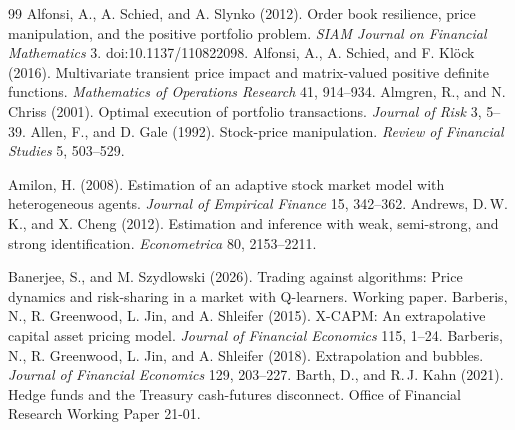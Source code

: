 \begin{thebibliography}{99}\setlength{\itemsep}{2pt}\small
{} Alfonsi, A., A. Schied, and A. Slynko (2012). Order book resilience, price manipulation, and the positive portfolio problem. \emph{SIAM Journal on Financial Mathematics} 3. doi:10.1137/110822098.
 Alfonsi, A., A. Schied, and F. Kl\"ock (2016). Multivariate transient price impact and matrix-valued positive definite functions. \emph{Mathematics of Operations Research} 41, 914--934.
 Almgren, R., and N. Chriss (2001). Optimal execution of portfolio transactions. \emph{Journal of Risk} 3, 5--39.
 Allen, F., and D. Gale (1992). Stock-price manipulation. \emph{Review of Financial Studies} 5, 503--529.

 Amilon, H. (2008). Estimation of an adaptive stock market model with heterogeneous agents. \emph{Journal of Empirical Finance} 15, 342--362.
 Andrews, D.\,W.\,K., and X. Cheng (2012). Estimation and inference with weak, semi-strong, and strong identification. \emph{Econometrica} 80, 2153--2211.

 Banerjee, S., and M. Szydlowski (2026). Trading against algorithms: Price dynamics and risk-sharing in a market with Q-learners. Working paper.
 Barberis, N., R. Greenwood, L. Jin, and A. Shleifer (2015). X-CAPM: An extrapolative capital asset pricing model. \emph{Journal of Financial Economics} 115, 1--24.
 Barberis, N., R. Greenwood, L. Jin, and A. Shleifer (2018). Extrapolation and bubbles. \emph{Journal of Financial Economics} 129, 203--227.
 Barth, D., and R.\,J. Kahn (2021). Hedge funds and the Treasury cash-futures disconnect. Office of Financial Research Working Paper 21-01.


\end{thebibliography}
